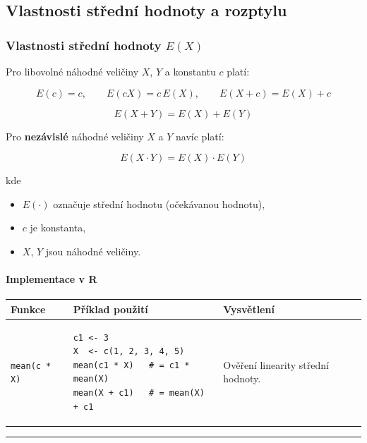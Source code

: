 \documentclass[a4paper, 11pt]{article}
\newenvironment{funkcedict}
{%
  \begingroup
  \renewcommand{\arraystretch}{1.4}%
  \lstset{basicstyle=\ttfamily\small, columns=fullflexible}%
  \setlength{\tabcolsep}{4pt}%
  \begin{tabular}{p{0.19\textwidth} p{0.38\textwidth} p{0.30\textwidth}}
  \textbf{Funkce} & \textbf{Příklad použití} & \textbf{Vysvětlení} \\
  \midrule
}
{%
  \end{tabular}%
  \endgroup
}
\begin{document}
\subsection{Vlastnosti střední hodnoty a rozptylu}

\subsubsection{Vlastnosti střední hodnoty $E(X)$}

Pro libovolné náhodné veličiny $X$, $Y$ a konstantu $c$ platí:

\begin{equation*}
	E(c) = c, \qquad E(cX) = c\,E(X), \qquad E(X + c) = E(X) + c
\end{equation*}

\begin{equation*}
	E(X + Y) = E(X) + E(Y)
\end{equation*}

Pro \textbf{nezávislé} náhodné veličiny $X$ a $Y$ navíc platí:

\begin{equation*}
	E(X \cdot Y) = E(X) \cdot E(Y)
\end{equation*}

kde

\begin{itemize}[noitemsep]
	\item $E(\cdot)$ označuje střední hodnotu (očekávanou hodnotu),
	\item $c$ je konstanta,
	\item $X$, $Y$ jsou náhodné veličiny.
\end{itemize}

\paragraph{Implementace v R}\mbox{}\par

\begin{funkcedict}

	\texttt{mean(c * X)} &
	\begin{lstlisting}
c1 <- 3
X  <- c(1, 2, 3, 4, 5)
mean(c1 * X)   # = c1 * mean(X)
mean(X + c1)   # = mean(X) + c1
	\end{lstlisting}
	&
	Ověření linearity střední hodnoty. \\

\end{funkcedict}

\noindent\hrule\medskip
\end{document}
